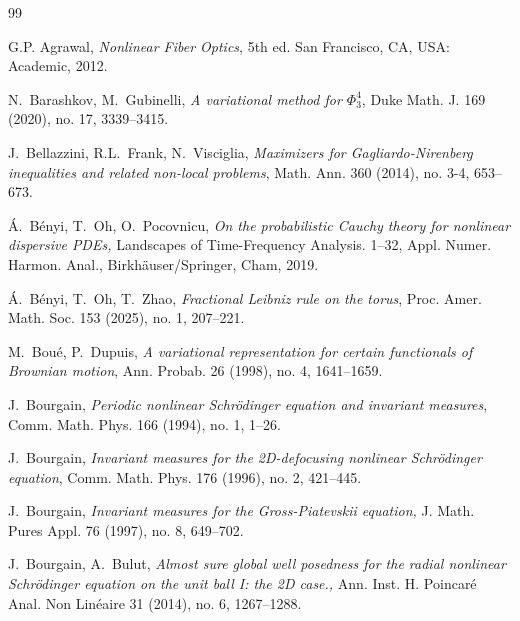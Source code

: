 \documentclass[letterpaper, 11pt,  reqno]{amsart}
\numberwithin{equation}{section}
\numberwithin{theorem}{section}
\begin{document}
\begin{thebibliography}{99} 
	
	
G.P. Agrawal, 
{\it Nonlinear Fiber Optics}, 5th ed. San Francisco, CA, USA: Academic, 2012.

	
	
	
N.~Barashkov, M.~Gubinelli, {\it A variational method for $\Phi_3^4$}, 
Duke Math. J. 169 (2020), no. 17, 3339--3415.
	
	
	
J.~Bellazzini, R.L.~Frank,  N.~Visciglia, {\it 
Maximizers for Gagliardo-Nirenberg inequalities and related non-local problems}, Math. Ann.  360 (2014), no. 3-4, 653--673.


\'A.~B\'enyi, T.~Oh, O.~Pocovnicu,
{\it  On the probabilistic Cauchy theory for nonlinear dispersive PDEs,} 
 Landscapes of Time-Frequency Analysis. 1--32, Appl. Numer. Harmon. Anal., Birkh\"auser/Springer, Cham, 2019. 

\'A.~B\'enyi, T.~Oh, T.~Zhao, 
{\it Fractional Leibniz rule on the torus}, Proc. Amer. Math. Soc. 153 (2025), no. 1, 207--221. 
	
M.~Bou{\'e},  P.~Dupuis, {\it A variational representation for certain functionals of Brownian motion}, Ann. Probab. 26 (1998), no. 4, 1641--1659.
	
J.~Bourgain, 
{\it Periodic nonlinear Schr\"odinger equation and invariant measures}, 
Comm. Math. Phys. 166 (1994), no. 1, 1--26.
	
J.~Bourgain, 
{\it Invariant measures for the 2D-defocusing nonlinear Schr\"odinger equation}, Comm. Math. Phys. 176 (1996), no. 2, 421--445. 
	
	

J.~Bourgain, 
{\it Invariant measures for the Gross-Piatevskii equation,} 
J. Math. Pures Appl. 76 (1997), no. 8, 649--702. 

	
	
J.~Bourgain,  A.~Bulut, 
{\it Almost sure global well posedness for the radial nonlinear Schr\"odinger equation on the unit ball I: the 2D case.,}
Ann. Inst. H. Poincar\'e Anal. Non Lin\'eaire 31 (2014), no. 6, 1267--1288.


\end{thebibliography}
\end{document}
